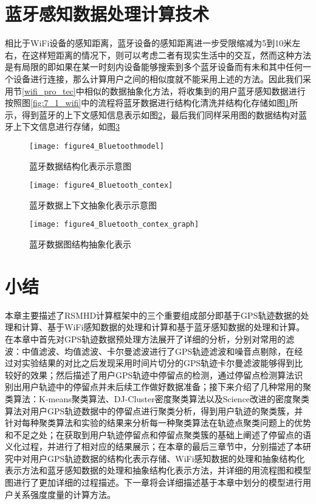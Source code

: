 \section{蓝牙感知数据处理计算技术}
相比于WiFi设备的感知距离，蓝牙设备的感知距离进一步受限缩减为5到10米左右，在这样短距离的情况下，则可以考虑二者有现实生活中的交互，然而这种方法是有局限的即如果在某一时刻内设备能够搜索到多个蓝牙设备而有未和其中任何一个设备进行连接，那么计算用户之间的相似度就不能采用上述的方法。因此我们采用节\ref{wifi_pro_tec}中相似的数据抽象化方法，将收集到的用户蓝牙感知数据进行按照图\ref{fig:7_1_wifi}中的流程将蓝牙数据进行结构化清洗并结构化存储如图\ref{fig:Bluetoothmodel}所示，得到蓝牙的上下文感知信息表示如图\ref{fig:bluetooth_context}，最后我们同样采用图的数据结构对蓝牙上下文信息进行存储，如图\ref{fig:bluetooth_context_graph}
\begin{figure}[htp]
\centering
\texttt{[image: figure4\_Bluetoothmodel]}
\caption{蓝牙数据结构化表示示意图}
\label{fig:Bluetoothmodel}
\end{figure}

\begin{figure}[htp]
\centering
\texttt{[image: figure4\_Bluetooth\_contex]}
\caption{蓝牙数据上下文抽象化表示示意图}
\label{fig:bluetooth_context}
\end{figure}

\begin{figure}[htb]
\centering
\texttt{[image: figure4\_Bluetooth\_contex\_graph]}
\caption{蓝牙数据图结构抽象化表示}
\label{fig:bluetooth_context_graph}
\end{figure}
\newpage
\section{小结}
\label{sec:section3-5}
本章主要描述了RSMHD计算框架中的三个重要组成部分即基于GPS轨迹数据的处理和计算、基于WiFi感知数据的处理和计算和基于蓝牙感知数据的处理和计算。在本章中首先对GPS轨迹数据预处理方法展开了详细的分析，分别对常用的滤波：中值滤波、均值滤波、卡尔曼滤波进行了GPS轨迹滤波和噪音点剔除，在经过对实验结果的对比之后发现采用时间片切分的GPS轨迹卡尔曼滤波能够得到比较好的效果；然后描述了用户GPS轨迹中停留点的检测，通过停留点检测算法识别出用户轨迹中的停留点并未后续工作做好数据准备；接下来介绍了几种常用的聚类算法：K-means聚类算法、DJ-Cluster密度聚类算法以及Science改进的密度聚类算法对用户GPS轨迹数据中的停留点进行聚类分析，得到用户轨迹的聚类簇，并针对每种聚类算法和实验的结果来分析每一种聚类算法在轨迹点聚类问题上的优势和不足之处；在获取到用户轨迹停留点和停留点聚类簇的基础上阐述了停留点的语义化过程，并进行了相对应的结果展示；在本章的最后三章节中，分别描述了本研究中对用户GPS轨迹数据的结构化表示存储、WiFi感知数据的处理和抽象结构化表示方法和蓝牙感知数据的处理和抽象结构化表示方法，并详细的用流程图和模型图进行了更加详细的过程描述。下一章将会详细描述基于本章中划分的模型进行用户关系强度度量的计算方法。


